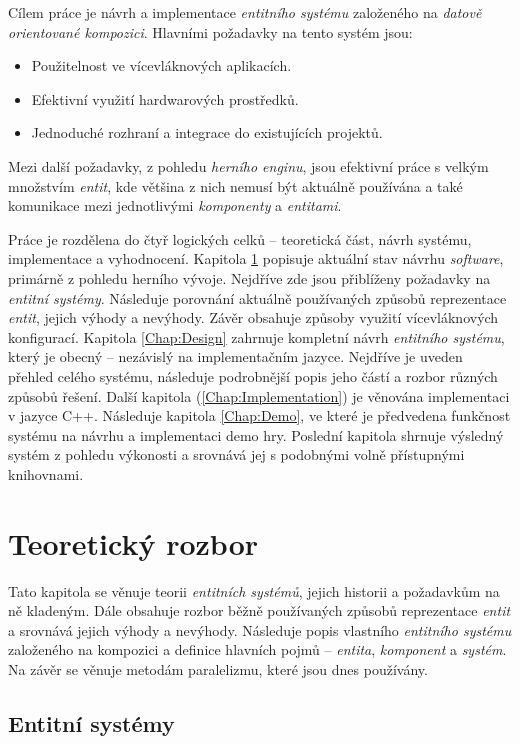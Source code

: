 Cílem práce je návrh a implementace \emph{entitního systému} založeného na \emph{datově orientované kompozici}. Hlavními požadavky na tento systém jsou: 
\begin{itemize}
	\item Použitelnost ve vícevláknových aplikacích.
	\item Efektivní využití hardwarových prostředků.
	\item Jednoduché rozhraní a integrace do existujících projektů.
\end{itemize}
Mezi další požadavky, z pohledu \emph{herního enginu}, jsou efektivní práce s velkým množstvím \emph{entit}, kde většina z nich nemusí být aktuálně používána a také komunikace mezi jednotlivými \emph{komponenty} a \emph{entitami}.

Práce je rozdělena do čtyř logických celků -- teoretická část, návrh systému, implementace a vyhodnocení. Kapitola \ref{Chap:Theory} popisuje aktuální stav návrhu \emph{software}, primárně z pohledu herního vývoje. Nejdříve zde jsou přiblíženy požadavky na \emph{entitní systémy}. Následuje porovnání aktuálně používaných způsobů reprezentace \emph{entit}, jejich výhody a nevýhody. Závěr obsahuje způsoby využití vícevláknových konfigurací. Kapitola \ref{Chap:Design} zahrnuje kompletní návrh \emph{entitního systému}, který je obecný -- nezávislý na implementačním jazyce. Nejdříve je uveden přehled celého systému, následuje podrobnější popis jeho částí a rozbor různých způsobů řešení. Další kapitola (\ref{Chap:Implementation}) je věnována implementaci v jazyce C++. Následuje kapitola \ref{Chap:Demo}, ve které je předvedena funkčnost systému na návrhu a implementaci demo hry. Poslední kapitola shrnuje výsledný systém z pohledu výkonosti a srovnává jej s podobnými volně přístupnými knihovnami.

\chapter{Teoretický rozbor}
\label{Chap:Theory}

Tato kapitola se věnuje teorii \emph{entitních systémů}, jejich historii a požadavkům na ně kladeným. Dále obsahuje rozbor běžně používaných způsobů reprezentace \emph{entit} a srovnává jejich výhody a nevýhody. Následuje popis vlastního \emph{entitního systému} založeného na kompozici a definice hlavních pojmů -- \emph{entita}, \emph{komponent} a \emph{systém}. Na závěr se věnuje metodám paralelizmu, které jsou dnes používány.

\section{Entitní systémy}

